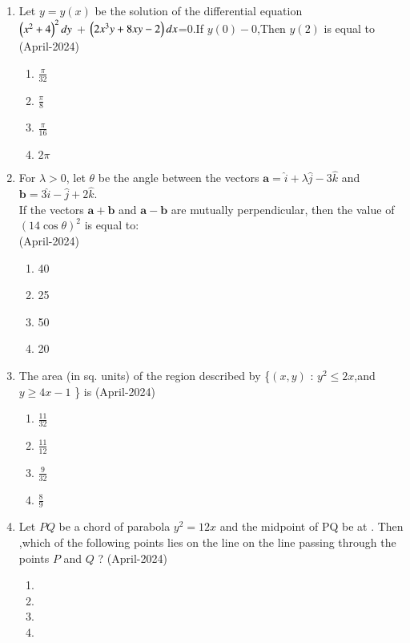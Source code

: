 \documentclass[journal,12pt,onecolumn]{IEEEtran}
\theoremstyle{remark}
\begin{document}
\begin{enumerate}
\item Let $y=y(x)$ be the solution of the differential equation \\
$\left(x^2+4\right)^2dy$ + $\left(2x^3y+8xy-2\right)dx$=0.If $y(0)-0$,Then $y(2)$ is equal to 
\hfill{(April-2024)}
\begin{multicols}{2}
\begin{enumerate}
\item $\frac{\pi}{32}$
\item $\frac{\pi}{8}$
\item $\frac{\pi}{16}$
\item $2\pi$
\end{enumerate}
\end{multicols}
\item For $\lambda > 0$, let $\theta$ be the angle between the vectors $\mathbf{a} = \hat{i} + \lambda \hat{j} - 3 \hat{k}$ and $\mathbf{b} = 3 \hat{i} - \hat{j} + 2 \hat{k}$. \\
If the vectors $\mathbf{a} + \mathbf{b}$ and $\mathbf{a} - \mathbf{b}$ are mutually perpendicular, then the value of $(14 \cos \theta)^2$ is equal to: \\
\hfill{(April-2024)}
\begin{multicols}{2}
\begin{enumerate}
\item 40
\item 25
\item 50
\item 20
\end{enumerate}
\end{multicols}
\item The area (in sq. units) of the region described by \{$(x, y)$ : $y^2 \leq 2x$,and $y \geq 4x - 1$ \} is
\hfill{(April-2024)}
\begin{multicols}{2}
\begin{enumerate}
\item $\frac{11}{32}$
\item $\frac{11}{12}$
\item $\frac{9}{32}$
\item $\frac{8}{9}$
\end{enumerate}
\end{multicols}
\item Let $PQ$ be a chord of parabola $y^2=12x$ and the midpoint of PQ be at  . Then ,which of the following points lies on the line on the line passing through the points $P$ and $Q$ ?
\hfill{(April-2024)}
\begin{multicols}{2}
\begin{enumerate}
\item {}
\item {}
\item {}
\item {}
\end{enumerate}
\end{multicols}
\end{enumerate}
\end{document}
